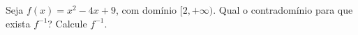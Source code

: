 Seja $f(x)=x^2-4x+9$, com domínio $[2,+\infty)$.
Qual o contradomínio para que exista $f^{-1}$?
Calcule $f^{-1}$.
